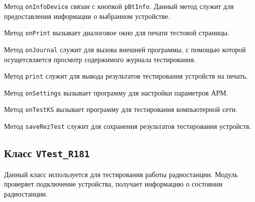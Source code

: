 \begin{enum}
	\item Метод \texttt{onInfoDevice} связан с кнопкой \texttt{pBtInfo}. Данный метод служит для предоставления
		информации о выбранном устройстве.

	\item Метод \texttt{onPrint} вызывает диалоговое окно для печати тестовой страницы.

	\item Метод \texttt{onJournal} служит для вызова внешней программы, с помощью которой осущетсвляется просмотр
		содержимого журнала тестирования.

	\item Метод \texttt{print} служит для вывода результатов тестирования устройств на печать.

	\item Метод \texttt{onSettings} вызывает программу для настройки параметров АРМ.

	\item Метод \texttt{onTestKS} вызывает программу для тестирования компьютерной сети.

	\item Метод \texttt{saveRezTest} служит для сохранения результатов тестирования устройств.
\end{enum}

\subsection{Класс \texttt{VTest\_R181}}
Данный класс используется для тестирования работы радиостанции. Модуль проверяет подключение устройства, получает
информацию о состоянии радиостанции.

